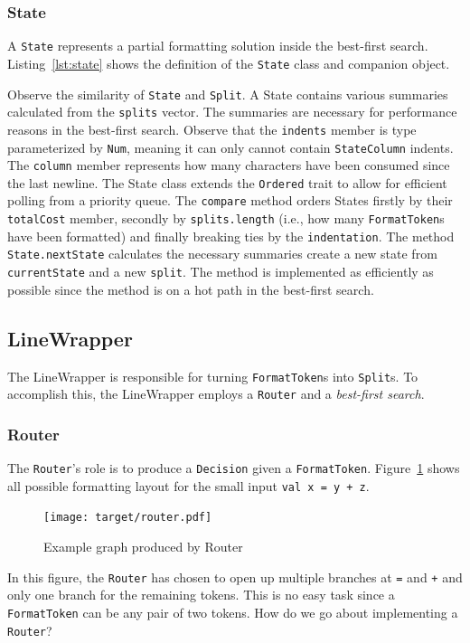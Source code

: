 \subsubsection{State}
A \texttt{State} represents a partial formatting solution inside the best-first search.
Listing~\ref{lst:state} shows the definition of the \texttt{State} class and companion object.
\begin{minipage}{\linewidth}
  
\end{minipage}
Observe the similarity of \texttt{State} and \texttt{Split}.
A State contains various summaries calculated from the \texttt{splits} vector.
The summaries are necessary for performance reasons in the best-first search.
Observe that the \texttt{indents} member is type parameterized by \texttt{Num}, meaning it can only cannot contain \texttt{StateColumn} indents.
The \texttt{column} member represents how many characters have been consumed since the last newline.
The State class extends the \texttt{Ordered} trait to allow for efficient polling from a priority queue.
The \texttt{compare} method orders States firstly by their \texttt{totalCost} member, secondly by \texttt{splits.length} (i.e., how many \texttt{FormatToken}s have been formatted) and finally breaking ties by the \texttt{indentation}.
The method \texttt{State.nextState} calculates the necessary summaries create a new state from \texttt{currentState} and a new \texttt{split}.
The method is implemented as efficiently as possible since the method is on a hot path in the best-first search.

\subsection{LineWrapper}
The LineWrapper is responsible for turning \texttt{FormatToken}s into \texttt{Split}s.
To accomplish this, the LineWrapper employs a \texttt{Router} and a \emph{best-first search}.

\subsubsection{Router}\label{sec:router}
The \texttt{Router}'s role is to produce a \texttt{Decision} given a \texttt{FormatToken}.
Figure~\ref{fig:router} shows all possible formatting layout for the small input \texttt{val x = y + z}.
\begin{figure}
  \centering
  \texttt{[image: target/router.pdf]}
  \caption{Example graph produced by Router}
  \label{fig:router}
\end{figure}
In this figure, the \texttt{Router} has chosen to open up multiple branches at \texttt{=} and \texttt{+} and only one branch for the remaining tokens.
This is no easy task since a \texttt{FormatToken} can be any pair of two tokens.
How do we go about implementing a \texttt{Router}?


